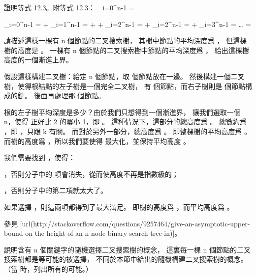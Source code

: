 \startsection[
  title={Randomly built binary search trees},
]

\startEXERCISE
證明等式 12.3。附等式 12.3：
\startformula
\sum_{i=0}^{n-1} = 
\stopformula
\stopEXERCISE

\startANSWER
\startformula\startmathalignment
\NC \sum_{i=0}^{n-1}
    \NC =  + \sum_{i=1}^{n-1} \NR
\NC \NC =  +  + \sum_{i=2}^{n-1} \NR
\NC \NC =  + \sum_{i=2}^{n-1} \NR
\NC \NC =  + \sum_{i=3}^{n-1} \NR
\NC \NC = \ldots \NR
\NC \NC =  \NR
\stopmathalignment\stopformula
\stopANSWER

\startEXERCISE
請描述這樣一棵有 n 個節點的二叉搜索樹，
其樹中節點的平均深度爲 ，
但這棵樹的高度是 。
一棵有 n 個節點的二叉搜索樹中節點的平均深度爲 ，
給出這棵樹高度的一個漸進上界。
\stopEXERCISE

\startANSWER
假設這樣構建二叉樹：給定 n 個節點，取  個節點放在一邊。
然後構建一個二叉樹，使得根結點的左子樹是一個完全二叉樹，
有  個節點，而右子樹則是  個節點構成的鏈。
後面再處理那  個節點。

根的左子樹平均深度是多少？由於我們只想得到一個漸進界，
讓我們選取一個 n，使得  正好比 2 的冪小 1，即 。
這種情況下，這部分的總高度爲 。
總數約爲 ，即 ，只跟 k 有關。
而對於另外一部分，總高度爲 。
即整棵樹的平均高度爲 。
而樹的高度爲 ，所以我們要使得  最大化，並保持平均高度 。

我們需要找到 ，使得：
\startigBase[n]
\item {}，否則分子中的 \m{\log} 項會消失，從而使高度不再是指數級的；
\item {}，否則分子中的第二項就太大了。
\stopigBase

如果選擇 ，則這兩項都得到了最大滿足。
即樹的高度爲 ，而平均高度爲 。

參見 [url(http://stackoverflow.com/questions/9257464/give-an-asymptotic-upper-bound-on-the-height-of-an-n-node-binary-search-tree-in)]。
\stopANSWER

\startEXERCISE
說明含有 n 個關鍵字的隨機選擇二叉搜索樹的概念，
這裏每一棵 n 個節點的二叉搜索樹都是等可能的被選擇，
不同於本節中給出的隨機構建二叉搜索樹的概念。
（\hint 當  時，列出所有的可能。）
\stopEXERCISE

